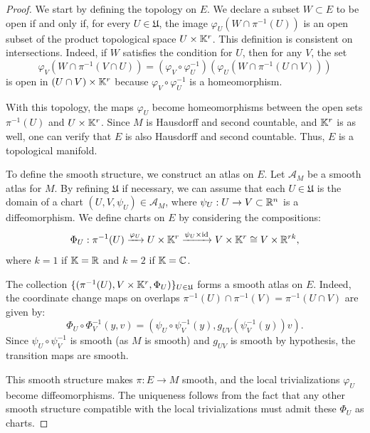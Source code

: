 \documentclass[11pt,a4paper]{book}
\theoremstyle{remark} \newtheorem{rmk}[thm]{Remark}
\theoremstyle{definition} \newtheorem{defn}[thm]{Definition}
\theoremstyle{definition} \newtheorem{ex}[thm]{Example}
\theoremstyle{definition} \newtheorem{ej}[thm]{Exercise}
\begin{document}
\begin{proof}
  We start by defining the topology on $E$. We declare a subset $W\subset E$ to be open if and only if, for every $U\in \mathfrak{U}$, the image $\varphi_U(W\cap \pi^{-1}(U))$ is an open subset of the product topological space $U\times \mathbb K^r$. This definition is consistent on intersections. Indeed, if $W$ satisfies the condition for $U$, then for any $V$, the set
  \[
  \varphi_V(W \cap \pi^{-1}(V \cap U)) = (\varphi_V \circ \varphi_U^{-1}) \left( \varphi_U(W \cap \pi^{-1}(U \cap V)) \right)
  \]
  is open in $(U \cap V) \times \mathbb K^r$ because $\varphi_V \circ \varphi_U^{-1}$ is a homeomorphism.

  With this topology, the maps $\varphi_U$ become homeomorphisms between the open sets $\pi^{-1}(U)$ and $U\times \mathbb K^r$. Since $M$ is Hausdorff and second countable, and $\mathbb K^r$ is as well, one can verify that $E$ is also Hausdorff and second countable. Thus, $E$ is a topological manifold.

  To define the smooth structure, we construct an atlas on $E$. Let $\mathcal{A}_M$ be a smooth atlas for $M$. By refining $\mathfrak{U}$ if necessary, we can assume that each $U \in \mathfrak{U}$ is the domain of a chart $(U, V, \psi_U) \in \mathcal{A}_M$, where $\psi_U: U \to V \subset \mathbb R^n$ is a diffeomorphism. We define charts on $E$ by considering the compositions:
  \[
  \Phi_U: \pi^{-1}(U) \xrightarrow{\varphi_U} U \times \mathbb K^r \xrightarrow{\psi_U \times \mathrm{id}} V \times \mathbb K^r \cong V \times \mathbb R^{rk},
  \]
  where $k=1$ if $\mathbb K=\mathbb R$ and $k=2$ if $\mathbb K=\mathbb C$.

  The collection $\{( \pi^{-1}(U), V \times \mathbb K^r, \Phi_U )\}_{U \in \mathfrak{U}}$ forms a smooth atlas on $E$. Indeed, the coordinate change maps on overlaps $\pi^{-1}(U) \cap \pi^{-1}(V) = \pi^{-1}(U \cap V)$ are given by:
  \[
  \Phi_U \circ \Phi_V^{-1} (y, v) = (\psi_U \circ \psi_V^{-1}(y), g_{UV}(\psi_V^{-1}(y)) v).
  \]
  Since $\psi_U \circ \psi_V^{-1}$ is smooth (as $M$ is smooth) and $g_{UV}$ is smooth by hypothesis, the transition maps are smooth.

  This smooth structure makes $\pi: E \to M$  smooth, and the local trivializations $\varphi_U$ become diffeomorphisms. The uniqueness follows from the fact that any other smooth structure compatible with the local trivializations must admit these $\Phi_U$ as charts.
\end{proof}
\end{document}
